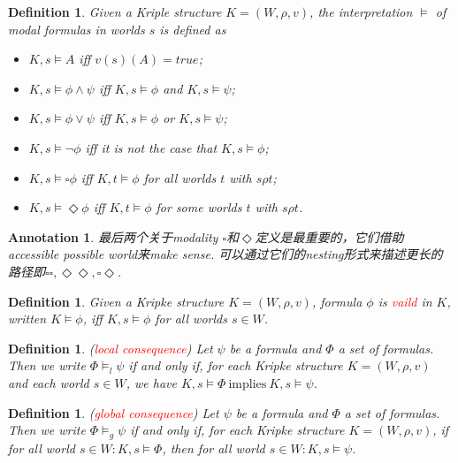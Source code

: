 \documentclass{article}
\theoremstyle{plain}
\newtheorem{definition}[theorem]{Definition}
\newtheorem{annotation}[theorem]{Annotation}
\newcounter{case}
\theoremstyle{nonumberplain}
\newcommand{\redt}[1]{\textcolor{red}{#1}}
\begin{document}
\begin{definition}
\rm Given a Kriple structure $K=(W, \rho, v)$, the interpretation  $\vDash$ of modal formulas in worlds $s$ is defined as
\begin{itemize}
	\item $K, s \vDash A$ iff $v(s)(A) = true$;
	\item $K, s \vDash \phi \wedge \psi$ iff $K, s \vDash \phi$ and $K, s \vDash \psi$;
	\item $K, s \vDash \phi \vee \psi$ iff $K, s \vDash \phi$ or $K, s \vDash \psi$;
	\item $K, s \vDash \neg \phi$ iff it is not the case that $K, s \vDash \phi$;
	\item $K, s \vDash \square \phi$ iff $K, t \vDash \phi$ for all worlds $t$ with $s \rho t$;
	\item $K, s \vDash \Diamond \phi$ iff $K, t \vDash \phi$ for some worlds $t$ with $s \rho t$.
\end{itemize}
\end{definition}

\begin{annotation}
\rm 最后两个关于modality $\square$和$\Diamond$定义是最重要的，它们借助accessible possible world来make sense. 可以通过它们的nesting形式来描述更长的路径即$\square\square,\Diamond\Diamond,\square\Diamond$. 
\end{annotation}

\begin{definition}
\rm Given a Kripke structure $K = (W,\rho, v)$, formula $\phi$ is \redt{vaild} in $K$, written $K \vDash \phi$, iff $K,s \vDash \phi$ for all worlds $s \in W$.
\end{definition}

\begin{definition}
\rm (\redt{local consequence}) Let $\psi$ be a formula and $\Phi$ a set of formulas. Then we write $\Phi \vDash_l \psi$ if and only if, for each Kripke structure $K = (W, \rho, v)$ and each world $s \in W$, we have $K, s \vDash \Phi~\text{implies}~K,s \vDash \psi$.  
\end{definition}

\begin{definition}
\rm (\redt{global consequence}) Let $\psi$ be a formula and $\Phi$ a set of formulas. Then we write $\Phi \vDash_g \psi$ if and only if, for each Kripke structure $K = (W, \rho, v)$, if for all world $s \in W:K, s \vDash \Phi$, then for all world $s \in W: K,s \vDash \psi$.
\end{definition}
\end{document}
